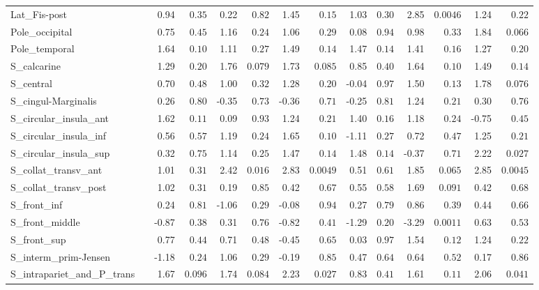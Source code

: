 {\begin{longtable}{llrrrrrrrrrrrr}
Lat\_Fis-post &  & 0.94 & $0.35$ & 0.22 & $0.82$ & 1.45 & $0.15$ & 1.03 & $0.30$ & 2.85 & $0.0046$ & 1.24 & $0.22$ \\
Pole\_occipital &  & 0.75 & $0.45$ & 1.16 & $0.24$ & 1.06 & $0.29$ & 0.08 & $0.94$ & 0.98 & $0.33$ & 1.84 & $0.066$ \\
Pole\_temporal &  & 1.64 & $0.10$ & 1.11 & $0.27$ & 1.49 & $0.14$ & 1.47 & $0.14$ & 1.41 & $0.16$ & 1.27 & $0.20$ \\
S\_calcarine &  & 1.29 & $0.20$ & 1.76 & $0.079$ & 1.73 & $0.085$ & 0.85 & $0.40$ & 1.64 & $0.10$ & 1.49 & $0.14$ \\
S\_central &  & 0.70 & $0.48$ & 1.00 & $0.32$ & 1.28 & $0.20$ & -0.04 & $0.97$ & 1.50 & $0.13$ & 1.78 & $0.076$ \\
S\_cingul-Marginalis &  & 0.26 & $0.80$ & -0.35 & $0.73$ & -0.36 & $0.71$ & -0.25 & $0.81$ & 1.24 & $0.21$ & 0.30 & $0.76$ \\
S\_circular\_insula\_ant &  & 1.62 & $0.11$ & 0.09 & $0.93$ & 1.24 & $0.21$ & 1.40 & $0.16$ & 1.18 & $0.24$ & -0.75 & $0.45$ \\
S\_circular\_insula\_inf &  & 0.56 & $0.57$ & 1.19 & $0.24$ & 1.65 & $0.10$ & -1.11 & $0.27$ & 0.72 & $0.47$ & 1.25 & $0.21$ \\
S\_circular\_insula\_sup &  & 0.32 & $0.75$ & 1.14 & $0.25$ & 1.47 & $0.14$ & 1.48 & $0.14$ & -0.37 & $0.71$ & 2.22 & $0.027$ \\
S\_collat\_transv\_ant &  & 1.01 & $0.31$ & 2.42 & $0.016$ & 2.83 & $0.0049$ & 0.51 & $0.61$ & 1.85 & $0.065$ & 2.85 & $0.0045$ \\
S\_collat\_transv\_post &  & 1.02 & $0.31$ & 0.19 & $0.85$ & 0.42 & $0.67$ & 0.55 & $0.58$ & 1.69 & $0.091$ & 0.42 & $0.68$ \\
S\_front\_inf &  & 0.24 & $0.81$ & -1.06 & $0.29$ & -0.08 & $0.94$ & 0.27 & $0.79$ & 0.86 & $0.39$ & 0.44 & $0.66$ \\
S\_front\_middle &  & -0.87 & $0.38$ & 0.31 & $0.76$ & -0.82 & $0.41$ & -1.29 & $0.20$ & -3.29 & $0.0011$ & 0.63 & $0.53$ \\
S\_front\_sup &  & 0.77 & $0.44$ & 0.71 & $0.48$ & -0.45 & $0.65$ & 0.03 & $0.97$ & 1.54 & $0.12$ & 1.24 & $0.22$ \\
S\_interm\_prim-Jensen &  & -1.18 & $0.24$ & 1.06 & $0.29$ & -0.19 & $0.85$ & 0.47 & $0.64$ & 0.64 & $0.52$ & 0.17 & $0.86$ \\
S\_intrapariet\_and\_P\_trans &  & 1.67 & $0.096$ & 1.74 & $0.084$ & 2.23 & $0.027$ & 0.83 & $0.41$ & 1.61 & $0.11$ & 2.06 & $0.041$ \\

\end{longtable}}
